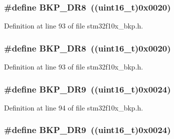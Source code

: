 \subsubsection[{\texorpdfstring{B\+K\+P\+\_\+\+D\+R8}{BKP_DR8}}]{\setlength{\rightskip}{0pt plus 5cm}\#define B\+K\+P\+\_\+\+D\+R8~(({\bf uint16\+\_\+t})0x0020)}\hypertarget{group___data___backup___register_gae6ed231677e748d838f37e7ab89e51ca}{}\label{group___data___backup___register_gae6ed231677e748d838f37e7ab89e51ca}


Definition at line 93 of file stm32f10x\+\_\+bkp.\+h.

\subsubsection[{\texorpdfstring{B\+K\+P\+\_\+\+D\+R8}{BKP_DR8}}]{\setlength{\rightskip}{0pt plus 5cm}\#define B\+K\+P\+\_\+\+D\+R8~(({\bf uint16\+\_\+t})0x0020)}\hypertarget{group___data___backup___register_gae6ed231677e748d838f37e7ab89e51ca}{}\label{group___data___backup___register_gae6ed231677e748d838f37e7ab89e51ca}


Definition at line 93 of file stm32f10x\+\_\+bkp.\+h.

\subsubsection[{\texorpdfstring{B\+K\+P\+\_\+\+D\+R9}{BKP_DR9}}]{\setlength{\rightskip}{0pt plus 5cm}\#define B\+K\+P\+\_\+\+D\+R9~(({\bf uint16\+\_\+t})0x0024)}\hypertarget{group___data___backup___register_ga69f61ba6d9ed1092dcd82a5df1a0e054}{}\label{group___data___backup___register_ga69f61ba6d9ed1092dcd82a5df1a0e054}


Definition at line 94 of file stm32f10x\+\_\+bkp.\+h.

\subsubsection[{\texorpdfstring{B\+K\+P\+\_\+\+D\+R9}{BKP_DR9}}]{\setlength{\rightskip}{0pt plus 5cm}\#define B\+K\+P\+\_\+\+D\+R9~(({\bf uint16\+\_\+t})0x0024)}\hypertarget{group___data___backup___register_ga69f61ba6d9ed1092dcd82a5df1a0e054}{}\label{group___data___backup___register_ga69f61ba6d9ed1092dcd82a5df1a0e054}


